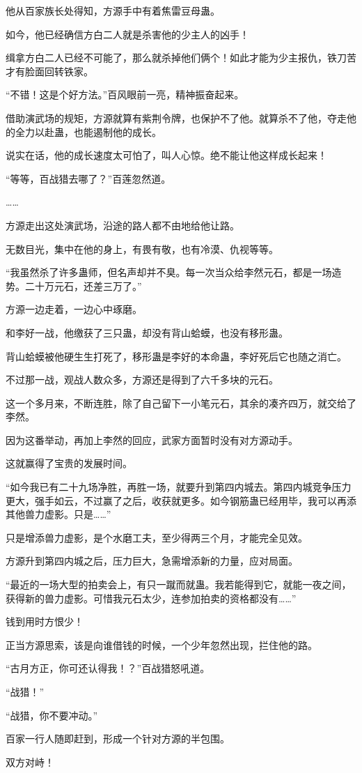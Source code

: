 \begin{this_body}
他从百家族长处得知，方源手中有着焦雷豆母蛊。

如今，他已经确信方白二人就是杀害他的少主人的凶手！

缉拿方白二人已经不可能了，那么就杀掉他们俩个！如此才能为少主报仇，铁刀苦才有脸面回转铁家。

“不错！这是个好方法。”百风眼前一亮，精神振奋起来。

借助演武场的规矩，方源就算有紫荆令牌，也保护不了他。就算杀不了他，夺走他的全力以赴蛊，也能遏制他的成长。

说实在话，他的成长速度太可怕了，叫人心惊。绝不能让他这样成长起来！

“等等，百战猎去哪了？”百莲忽然道。

……

方源走出这处演武场，沿途的路人都不由地给他让路。

无数目光，集中在他的身上，有畏有敬，也有冷漠、仇视等等。

“我虽然杀了许多蛊师，但名声却并不臭。每一次当众给李然元石，都是一场造势。二十万元石，还差三万了。”

方源一边走着，一边心中琢磨。

和李好一战，他缴获了三只蛊，却没有背山蛤蟆，也没有移形蛊。

背山蛤蟆被他硬生生打死了，移形蛊是李好的本命蛊，李好死后它也随之消亡。

不过那一战，观战人数众多，方源还是得到了六千多块的元石。

这一个多月来，不断连胜，除了自己留下一小笔元石，其余的凑齐四万，就交给了李然。

因为这番举动，再加上李然的回应，武家方面暂时没有对方源动手。

这就赢得了宝贵的发展时间。

“如今我已有二十九场净胜，再胜一场，就要升到第四内城去。第四内城竞争压力更大，强手如云，不过赢了之后，收获就更多。如今钢筋蛊已经用毕，我可以再添其他兽力虚影。只是……”

只是增添兽力虚影，是个水磨工夫，至少得两三个月，才能完全见效。

方源升到第四内城之后，压力巨大，急需增添新的力量，应对局面。

“最近的一场大型的拍卖会上，有只一蹴而就蛊。我若能得到它，就能一夜之间，获得新的兽力虚影。可惜我元石太少，连参加拍卖的资格都没有……”

钱到用时方恨少！

正当方源思索，该是向谁借钱的时候，一个少年忽然出现，拦住他的路。

“古月方正，你可还认得我！？”百战猎怒吼道。

“战猎！”

“战猎，你不要冲动。”

百家一行人随即赶到，形成一个针对方源的半包围。

双方对峙！

\end{this_body}

